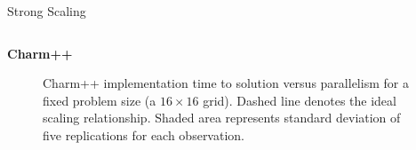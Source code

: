 \begin{block}{Strong Scaling}
\begin{columns}
\begin{column}{0.5\textwidth}
\begin{alertblock}{\textbf{Charm++}}
\begin{figure}
  	\caption{
      Charm++ implementation time to solution versus parallelism for a fixed problem size (a $16\times16$ grid).
      Dashed line denotes the ideal scaling relationship.
      Shaded area represents standard deviation of five replications for each observation.
    }
\end{figure}
\end{alertblock}
\end{column}
\end{columns}
\end{block}

\vspace{5ex}
